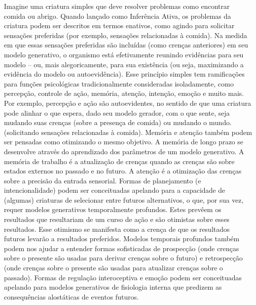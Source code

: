 \documentclass[
  12pt,
]{book}
\begin{document}
Imagine uma criatura simples que deve resolver problemas como encontrar comida ou abrigo. Quando lançado como Inferência Ativa, os problemas da criatura podem ser descritos em termos enativos, como agindo para solicitar sensações preferidas (por exemplo, sensações relacionadas à comida). Na medida em que essas sensações preferidas são incluídas (como crenças anteriores) em seu modelo generativo, o organismo está efetivamente reunindo evidências para seu modelo -- ou, mais alegoricamente, para sua existência (ou seja, maximizando a evidência do modelo ou autoevidência). Esse princípio simples tem ramificações para funções psicológicas tradicionalmente consideradas isoladamente, como percepção, controle de ação, memória, atenção, intenção, emoção e muito mais. Por exemplo, percepção e ação são autoevidentes, no sentido de que uma criatura pode alinhar o que espera, dado seu modelo gerador, com o que sente, seja mudando suas crenças (sobre a presença de comida) ou mudando o mundo. (solicitando sensações relacionadas à comida). Memória e atenção também podem ser pensadas como otimizando o mesmo objetivo. A memória de longo prazo se desenvolve através do aprendizado dos parâmetros de um modelo generativo. A memória de trabalho é a atualização de crenças quando as crenças são sobre estados externos no passado e no futuro. A atenção é a otimização das crenças sobre a precisão da entrada sensorial. Formas de planejamento (e intencionalidade) podem ser conceituadas apelando para a capacidade de (algumas) criaturas de selecionar entre futuros alternativos, o que, por sua vez, requer modelos generativos temporalmente profundos. Estes prevêem os resultados que resultariam de um curso de ação e são otimistas sobre esses resultados. Esse otimismo se manifesta como a crença de que os resultados futuros levarão a resultados preferidos. Modelos temporais profundos também podem nos ajudar a entender formas sofisticadas de prospecção (onde crenças sobre o presente são usadas para derivar crenças sobre o futuro) e retrospecção (onde crenças sobre o presente são usadas para atualizar crenças sobre o passado). Formas de regulação interoceptiva e emoção podem ser conceituadas apelando para modelos generativos de fisiologia interna que predizem as consequências alostáticas de eventos futuros.
\end{document}
